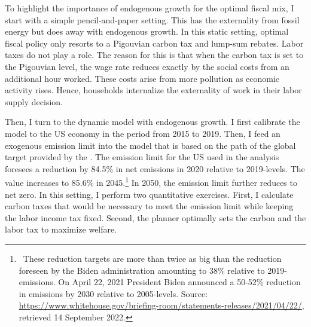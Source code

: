 To highlight the importance of endogenous growth for the optimal fiscal mix, I start with a simple pencil-and-paper setting. This has the externality from fossil energy but does away with endogenous growth. In this static setting, optimal fiscal policy only resorts to a Pigouvian carbon tax and lump-sum rebates. Labor taxes do not play a role. The reason for this is that when the carbon tax is set to the Pigouvian level, the wage rate reduces exactly by the social costs from an additional hour worked. These costs arise from more pollution as economic activity rises. Hence, households internalize the externality of work in their labor supply decision.

Then, I turn to the dynamic model with endogenous growth. I first calibrate the model to the US economy in the period from 2015 to 2019. Then, I feed an exogenous emission limit into the model that is based on the path of the global target provided by the \cite{IPCC2022}. The emission limit for the US used in the analysis foresees a reduction by 84.5\% in net emissions  in 2020 relative to 2019-levels. The value increases to 85.6\% in 2045.\footnote{\  These reduction targets are more than twice as big than the reduction foreseen by the Biden administration amounting to 38\% relative to 2019-emissions. On April 22, 2021 President Biden announced a 50-52\% reduction in emissions by 2030 relative to 2005-levels. Source:  \href{https://www.whitehouse.gov/briefing-room/statements-releases/2021/04/22/fact-sheet-president-biden-sets-2030-greenhouse-gas-pollution-reduction-target-aimed-at-creating-good-paying-union-jobs-and-securing-u-s-leadership-on-clean-energy-technologies/}{https://www.whitehouse.gov/briefing-room/statements-releases/2021/04/22/}, retrieved 14 September 2022.} In 2050, the emission limit further reduces to net zero.
In this setting, I perform two quantitative exercises. First, I calculate carbon taxes that would be necessary to meet the emission limit while keeping the labor income tax fixed. Second,  the planner optimally sets the carbon and the labor tax to maximize welfare.

